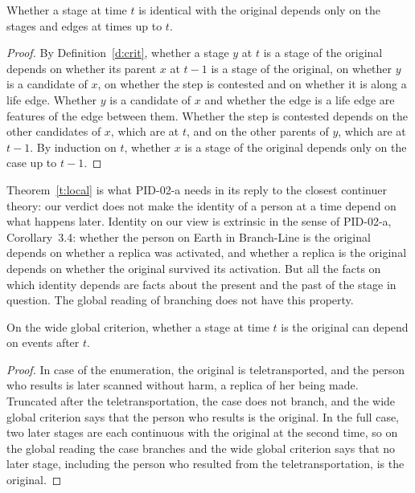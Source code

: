 \documentclass{situationist-preprint}
\begin{document}
\begin{theorem}\label{t:local}
Whether a stage at time $t$ is identical with the original depends only on the stages and edges at times up to $t$.
\end{theorem}

\begin{proof}
By Definition~\ref{d:crit}, whether a stage $y$ at $t$ is a stage of the original depends on whether its parent $x$ at $t-1$ is a stage of the original, on whether $y$ is a candidate of $x$, on whether the step is contested and on whether it is along a life edge. Whether $y$ is a candidate of $x$ and whether the edge is a life edge are features of the edge between them. Whether the step is contested depends on the other candidates of $x$, which are at $t$, and on the other parents of $y$, which are at $t-1$. By induction on $t$, whether $x$ is a stage of the original depends only on the case up to $t-1$.
\end{proof}

Theorem~\ref{t:local} is what PID-02-a needs in its reply to the closest continuer theory: our verdict does not make the identity of a person at a time depend on what happens later. Identity on our view is extrinsic in the sense of PID-02-a, Corollary~3.4: whether the person on Earth in Branch-Line is the original depends on whether a replica was activated, and whether a replica is the original depends on whether the original survived its activation. But all the facts on which identity depends are facts about the present and the past of the stage in question. The global reading of branching does not have this property.

\begin{proposition}\label{p:global}
On the wide global criterion, whether a stage at time $t$ is the original can depend on events after $t$.
\end{proposition}

\begin{proof}
In case \caseTeleBranch{} of the enumeration, the original is teletransported, and the person who results is later scanned without harm, a replica of her being made. Truncated after the teletransportation, the case does not branch, and the wide global criterion says that the person who results is the original. In the full case, two later stages are each continuous with the original at the second time, so on the global reading the case branches and the wide global criterion says that no later stage, including the person who resulted from the teletransportation, is the original.
\end{proof}
\end{document}

